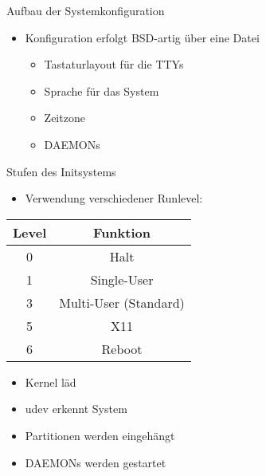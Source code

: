 
\begin{slide}{Aufbau der Systemkonfiguration}
	\begin{itemize}
		\item{Konfiguration erfolgt BSD-artig \"{u}ber eine Datei
			\begin{itemize}
				\item{Tastaturlayout f\"{u}r die TTYs}
				\item{Sprache f\"{u}r das System}
				\item{Zeitzone}
				\item{DAEMONs}
			\end{itemize}
		}
	\end{itemize}
\end{slide}


\begin{slide}{Stufen des Initsystems}
	\begin{itemize}
		\item{Verwendung verschiedener Runlevel:}
	\end{itemize}
	\begin{tabular}{|c|c|}
		\hline Level & Funktion\\
		\hline 0 & Halt\\
		\hline 1 & Single-User\\
		\hline 3 & Multi-User (Standard)\\
		\hline 5 & X11\\
		\hline 6 & Reboot\\
		\hline
	\end{tabular}
	\begin{itemize}
		\item{Kernel l\"{a}d}
		\item{udev erkennt System}
		\item{Partitionen werden eingeh\"{a}ngt}
		\item{DAEMONs werden gestartet}
	\end{itemize}
\end{slide}
